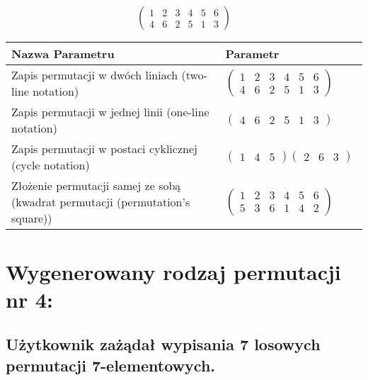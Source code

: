 \documentclass[12pt]{article}
\begin{document}
\subsection{}
\begin{center}
\[
\begin{pmatrix}
	1 & 2 & 3 & 4 & 5 & 6 \\ 
	4 & 6 & 2 & 5 & 1 & 3 
\end{pmatrix}
\]

\begin{tabular}{|m{0.6\linewidth}|m{0.4\linewidth}|}
	\hline
	Nazwa Parametru & Parametr \\
	\hline
	Zapis permutacji w dwóch liniach (two-line notation) & $\begin{pmatrix} 1 & 2 & 3 & 4 & 5 & 6 \\ 
4 & 6 & 2 & 5 & 1 & 3 \end{pmatrix}$ \\ 
	\hline
	Zapis permutacji w jednej linii (one-line notation) & $\begin{pmatrix} 4 & 6 & 2 & 5 & 1 & 3 \end{pmatrix}$ \\ 
	\hline
	Zapis permutacji w postaci cyklicznej (cycle notation) & $\begin{pmatrix} 1 & 4 & 5 \end{pmatrix} \begin{pmatrix} 2 & 6 & 3 \end{pmatrix} $ \\ 
	\hline
	Złożenie permutacji samej ze sobą (kwadrat permutacji (permutation's square)) & $\begin{pmatrix} 1 & 2 & 3 & 4 & 5 & 6 \\ 
5 & 3 & 6 & 1 & 4 & 2 \end{pmatrix}$ \\ 
	\hline
\end{tabular}
\end{center}


\section{Wygenerowany rodzaj permutacji nr 4:}
\subsection*{Użytkownik zażądał wypisania 7 losowych permutacji 7-elementowych.}
\end{document}
